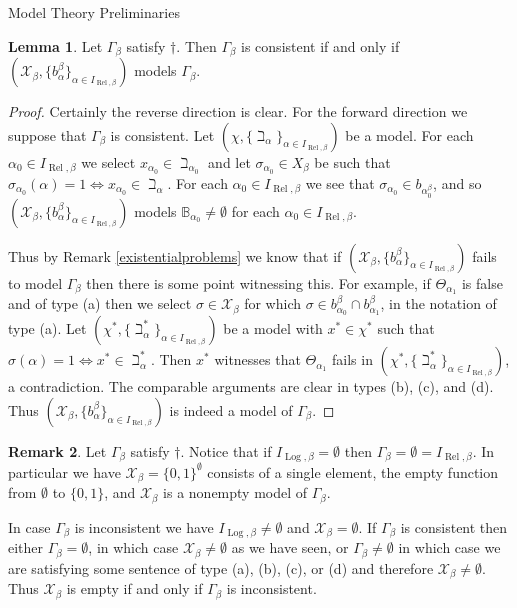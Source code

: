 \documentclass{amsart}
\theoremstyle{definition}\newtheorem{theorem}{Theorem}
\theoremstyle{definition}\newtheorem{bigtheorem}{Theorem}
\numberwithin{theorem}{section}
\theoremstyle{definition}\newtheorem{corollary}[theorem]{Corollary}
\theoremstyle{definition}\newtheorem{proposition}[theorem]{Proposition}
\theoremstyle{definition}\newtheorem{definition}[theorem]{Definition}
\theoremstyle{definition}\newtheorem{question}[theorem]{Question}
\theoremstyle{definition}\newtheorem{example}[theorem]{Example}
\theoremstyle{definition}\newtheorem{remark}[theorem]{Remark}
\theoremstyle{definition}\newtheorem{note}[theorem]{Note}
\theoremstyle{definition}\newtheorem{lemma}[theorem]{Lemma}
\theoremstyle{definition}\newtheorem{fact}[theorem]{Fact}
\theoremstyle{definition}\newtheorem{define}[theorem]{Definition}
\theoremstyle{definition}\newtheorem{definitions}[theorem]{Definitions}
\theoremstyle{definition}\newtheorem{claim}[theorem]{Claim}
\theoremstyle{definition}\newtheorem{obs}[theorem]{Observation}
\theoremstyle{definition}\newtheorem{construction}[theorem]{Construction}
\newcommand{\B}{\mathbb{B}}
\newcommand{\Rel}{\operatorname{Rel}}
\newcommand{\Log}{\operatorname{Log}}
\newcommand{\X}{\mathcal{X}}
\begin{document}
\begin{section}{Model Theory Preliminaries}
\begin{lemma}\label{nicemodel} Let $\Gamma_{\beta}$ satisfy $\dagger$.  Then $\Gamma_{\beta}$ is consistent if and only if $(\X_{\beta}, \{b_{\alpha}^{\beta}\}_{\alpha \in I_{\Rel, \beta}})$ models $\Gamma_{\beta}$.
\end{lemma}

\begin{proof}  Certainly the reverse direction is clear.  For the forward direction we suppose that $\Gamma_{\beta}$ is consistent.  Let $(\chi, \{\beth_{\alpha}\}_{\alpha \in I_{\Rel, \beta}})$ be a model.  For each $\alpha_0 \in I_{\Rel, \beta}$ we select $x_{\alpha_0} \in \beth_{\alpha_0}$ and let $\sigma_{\alpha_0} \in X_{\beta}$ be such that $\sigma_{\alpha_0}(\alpha) = 1 \Leftrightarrow x_{\alpha_0}\in \beth_{\alpha}$.  For each $\alpha_0\in I_{\Rel, \beta}$ we see that $\sigma_{\alpha_0} \in b_{\alpha_0^{\beta}}$, and so $(\X_{\beta}, \{b_{\alpha}^{\beta}\}_{\alpha \in I_{\Rel, \beta}})$ models $\B_{\alpha_0} \neq \emptyset$ for each $\alpha_0 \in I_{\Rel, \beta}$.

Thus by Remark \ref{existentialproblems} we know that if $(\X_{\beta}, \{b_{\alpha}^{\beta}\}_{\alpha \in I_{\Rel, \beta}})$ fails to model $\Gamma_{\beta}$ then there is some point witnessing this.  For example, if $\Theta_{\alpha_1}$ is false and of type (a) then we select $\sigma \in \X_{\beta}$ for which $\sigma \in b_{\alpha_0}^{\beta} \cap b_{\alpha_1}^{\beta}$, in the notation of type (a).  Let $(\chi^*, \{\beth_{\alpha}^*\}_{\alpha \in I_{\Rel, \beta}})$ be a model with $x^* \in \chi^*$ such that $\sigma(\alpha) = 1 \Leftrightarrow  x^* \in \beth_{\alpha}^*$.  Then $x^*$ witnesses that $\Theta_{\alpha_1}$ fails in $(\chi^*, \{\beth_{\alpha}^*\}_{\alpha \in I_{\Rel, \beta}})$, a contradiction.  The comparable arguments are clear in types (b), (c), and (d).  Thus $(\X_{\beta}, \{b_{\alpha}^{\beta}\}_{\alpha \in I_{\Rel, \beta}})$ is indeed a model of $\Gamma_{\beta}$.
\end{proof}

\begin{remark}\label{emptylogic}  Let $\Gamma_{\beta}$ satisfy $\dagger$.  Notice that if $I_{\Log, \beta} = \emptyset$ then $\Gamma_{\beta} = \emptyset = I_{\Rel, \beta}$.  In particular we have $\X_{\beta} = \{0, 1\}^{\emptyset}$ consists of a single element, the empty function from $\emptyset$ to $\{0, 1\}$, and $\X_{\beta}$ is a nonempty model of $\Gamma_{\beta}$.

In case $\Gamma_{\beta}$ is inconsistent we have $I_{\Log, \beta} \neq \emptyset$ and $\X_{\beta} = \emptyset$.  If $\Gamma_{\beta}$ is consistent then either $\Gamma_{\beta} = \emptyset$, in which case $\X_{\beta}\neq \emptyset$ as we have seen, or $\Gamma_{\beta} \neq \emptyset$ in which case we are satisfying some sentence of type (a), (b), (c), or (d) and therefore $\X_{\beta} \neq \emptyset$.  Thus $\X_{\beta}$ is empty if and only if $\Gamma_{\beta}$ is inconsistent.
\end{remark}


\end{section}
\end{document}
